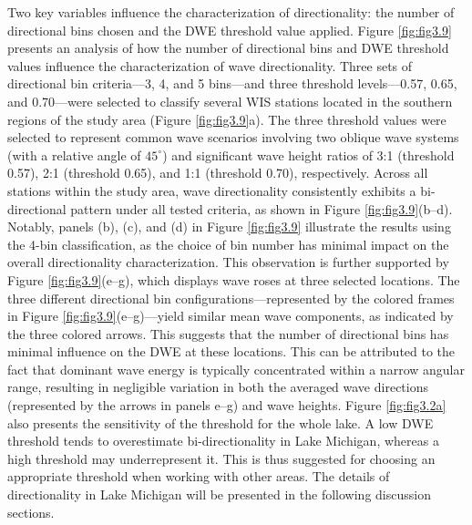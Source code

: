 Two key variables influence the characterization of directionality: the number
of directional bins chosen and the DWE threshold value applied. Figure
\ref{fig:fig3.9} presents an analysis of how the number of directional bins and
DWE threshold values influence the characterization of wave directionality.
Three sets of directional bin criteria—3, 4, and 5 bins—and three threshold
levels—0.57, 0.65, and 0.70—were selected to classify several WIS stations
located in the southern regions of the study area (Figure \ref{fig:fig3.9}a).
The three threshold values were selected to represent common wave scenarios
involving two oblique wave systems (with a relative angle of $45^\circ$) and
significant wave height ratios of 3:1 (threshold 0.57), 2:1 (threshold 0.65),
and 1:1 (threshold 0.70), respectively. Across all stations within the study
area, wave directionality consistently exhibits a bi-directional pattern under
all tested criteria, as shown in Figure \ref{fig:fig3.9}(b–d). Notably, panels
(b), (c), and (d) in Figure \ref{fig:fig3.9} illustrate the results using the
4-bin classification, as the choice of bin number has minimal impact on the
overall directionality characterization. This observation is further supported
by Figure \ref{fig:fig3.9}(e–g), which displays wave roses at three selected
locations. The three different directional bin configurations—represented by the
colored frames in Figure \ref{fig:fig3.9}(e–g)—yield similar mean wave
components, as indicated by the three colored arrows. This suggests that the
number of directional bins has minimal influence on the DWE at these locations.
This can be attributed to the fact that dominant wave energy is typically
concentrated within a narrow angular range, resulting in negligible variation in
both the averaged wave directions (represented by the arrows in panels e–g) and
wave heights. Figure \ref{fig:fig3.2a} also presents the sensitivity of the
threshold for the whole lake. A low DWE threshold tends to overestimate
bi-directionality in Lake Michigan, whereas a high threshold may underrepresent
it. This is thus suggested for choosing an appropriate threshold when working
with other areas. The details of directionality in Lake Michigan will be
presented in the following discussion sections.

